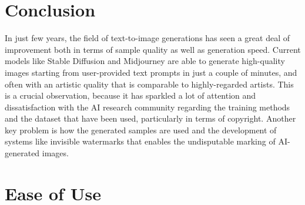 \documentclass[conference]{IEEEtran}
\begin{document}
\section{Conclusion}
In just few years, the field of text-to-image generations has seen a great deal of improvement both in terms of sample quality as well as generation speed. Current models like Stable Diffusion and Midjourney are able to generate high-quality images starting from user-provided text prompts in just a couple of minutes, and often with an artistic quality that is comparable to highly-regarded artists. This is a crucial observation, because it has sparkled a lot of attention and dissatisfaction with the AI research community regarding the training methods and the dataset that have been used, particularly in terms of copyright. Another key problem is how the generated samples are used and the development of systems like invisible watermarks \cite{invisiblewatermark} that enables the undisputable marking of AI-generated images.

%


\iffalse
\section{Ease of Use}
\end{document}
